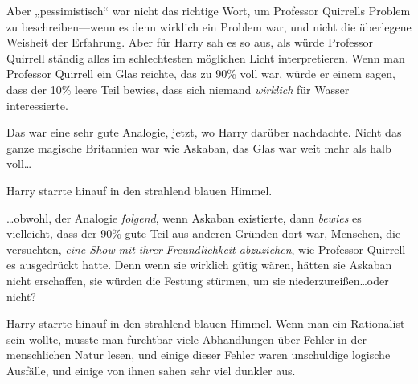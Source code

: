 Aber „pessimistisch“ war nicht das richtige Wort, um Professor Quirrells Problem zu beschreiben—wenn es denn wirklich ein Problem war, und nicht die überlegene Weisheit der Erfahrung. Aber für Harry sah es so aus, als würde Professor Quirrell ständig alles im schlechtesten möglichen Licht interpretieren. Wenn man Professor Quirrell ein Glas reichte, das zu 90\% voll war, würde er einem sagen, dass der 10\% leere Teil bewies, dass sich niemand \emph{wirklich} für Wasser interessierte.

Das war eine sehr gute Analogie, jetzt, wo Harry darüber nachdachte. Nicht das ganze magische Britannien war wie Askaban, das Glas war weit mehr als halb voll…

Harry starrte hinauf in den strahlend blauen Himmel.

…obwohl, der Analogie \emph{folgend}, wenn Askaban existierte, dann \emph{bewies} es vielleicht, dass der 90\% gute Teil aus anderen Gründen dort war, Menschen, die versuchten, \emph{eine Show} \emph{mit ihrer} \emph{Freundlichkeit abzuziehen}, wie Professor Quirrell es ausgedrückt hatte. Denn wenn sie wirklich gütig wären, hätten sie Askaban nicht erschaffen, sie würden die Festung stürmen, um sie niederzureißen…oder nicht?

Harry starrte hinauf in den strahlend blauen Himmel. Wenn man ein Rationalist sein wollte, musste man furchtbar viele Abhandlungen über Fehler in der menschlichen Natur lesen, und einige dieser Fehler waren unschuldige logische Ausfälle, und einige von ihnen sahen sehr viel dunkler aus.

